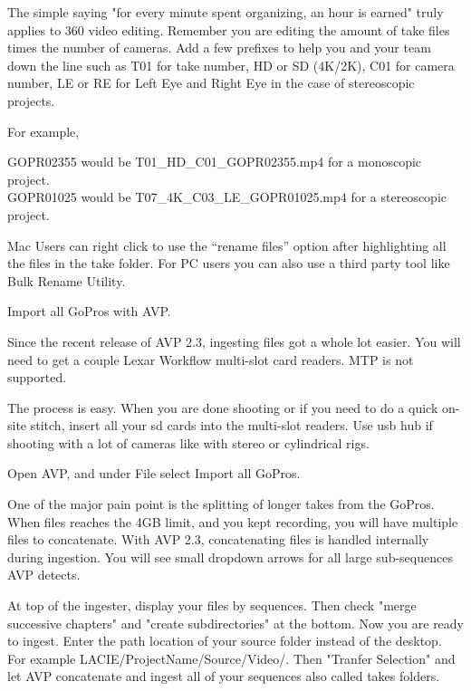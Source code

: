 \begin{fullwidth}
The simple saying "for every minute spent organizing, an hour is earned" truly applies to 360 video editing. Remember you are editing the amount of take files times the number of cameras. Add a few prefixes to help you and your team down the line such as T01 for take number, HD or SD (4K/2K), C01 for camera number, LE or RE for Left Eye and Right Eye in the case of stereoscopic projects.

For example,

GOPR02355 would be T01\_HD\_C01\_GOPR02355.mp4 for a monoscopic project.
\\
GOPR01025 would be T07\_4K\_C03\_LE\_GOPR01025.mp4 for a stereoscopic project.

\tip Mac Users can right click to use the “rename files” option after highlighting all the files in the take folder. For PC users you can also use a third party tool like Bulk Rename Utility.

{\large Import all GoPros with AVP. \par}

Since the recent release of AVP 2.3, ingesting files got a whole lot easier. You will need to get a couple Lexar Workflow multi-slot card readers. MTP is not supported.

The process is easy. When you are done shooting or if you need to do a quick on-site stitch, insert all your sd cards into the multi-slot readers. Use usb hub if shooting with a lot of cameras like with stereo or cylindrical rigs.

Open AVP, and under File select Import all GoPros.


One of the major pain point is the splitting of longer takes from the GoPros. When files reaches the 4GB limit, and you kept recording, you will have multiple files to concatenate. With AVP 2.3, concatenating files is handled internally during ingestion. You will see small dropdown arrows for all large sub-sequences AVP detects.


At top of the ingester, display your files by sequences. Then check "merge successive chapters" and "create subdirectories" at the bottom. Now you are ready to ingest. Enter the path location of your source folder instead of the desktop. For example LACIE/ProjectName/Source/Video/. Then "Tranfer Selection" and let AVP concatenate and ingest all of your sequences also called takes folders.



\end{fullwidth}
